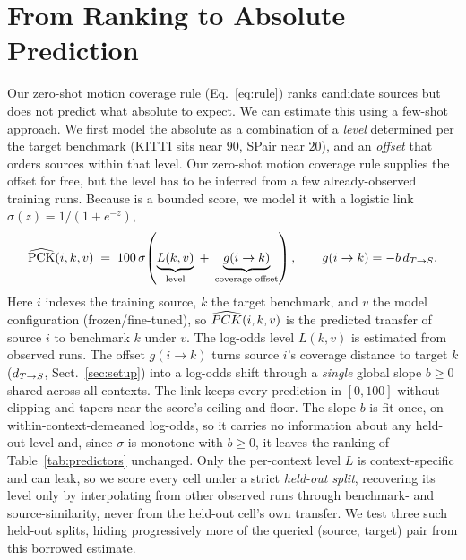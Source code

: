 \section{From Ranking to Absolute Prediction}
\label{sec:absolute}

Our zero-shot motion coverage rule (Eq.~\ref{eq:rule}) ranks candidate sources but does not predict what absolute \pck{} to expect. We can estimate this using a few-shot approach. We first model the absolute \pck{} as a combination of a \emph{level} determined per the target benchmark (KITTI sits near $90$, SPair near $20$), and an \emph{offset} that orders
sources within that level. Our zero-shot motion coverage rule supplies the offset for free, but the level has to
be inferred from a few already-observed training runs. Because \pck{} is a bounded score, we
model it with a logistic link $\sigma(z)=1/(1+e^{-z})$,
\begin{equation}
\widehat{\text{PCK}}(i,k,v) \;=\; 100\,\sigma\!\left(
\underbrace{L(k,v)}_{\text{level}}
\;+\; \underbrace{g(i \to k)}_{\text{coverage offset}} \right),
\qquad g(i\to k)=-b\,d_{T\to S}.
\label{eq:decomp}
\end{equation}
Here $i$ indexes the training source, $k$ the target benchmark, and $v$ the model
configuration (frozen/fine-tuned), so $\widehat{PCK}(i,k,v)$ is the predicted transfer of source $i$ to
benchmark $k$ under $v$. The log-odds level $L(k,v)$ is estimated from observed runs.
The offset $g(i\to k)$ turns source $i$'s coverage distance to target $k$ ($d_{T\to S}$,
Sect.~\ref{sec:setup}) into a log-odds shift through a \emph{single} global slope
$b\ge0$ shared across all contexts. The link keeps every
prediction in $[0,100]$ without clipping and tapers near the score's ceiling and
floor. The slope $b$ is fit once, on within-context-demeaned log-odds, so it
carries no information about any held-out level and, since $\sigma$ is monotone with
$b\ge0$, it leaves the ranking of Table~\ref{tab:predictors} unchanged. Only the
per-context level $L$ is context-specific and can leak, so we score every cell
under a strict \emph{held-out split}, recovering its level only by interpolating
from other observed runs through benchmark- and source-similarity, never from the
held-out cell's own transfer. We test three such held-out splits, hiding
progressively more of the queried (source, target) pair from this borrowed estimate.

